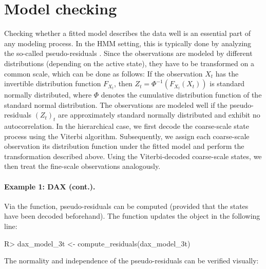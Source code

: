 \documentclass[article]{jss}
\newcommand{\fct}[1]{\code{#1()}}
\begin{document}
\section{Model checking} \label{sec:model_checking} %

Checking whether a fitted model describes the data well is an essential part of any modeling process. In the HMM setting, this is typically done by analyzing the so-called pseudo-residuals \citep{zuc16}. Since the observations are modeled by different distributions (depending on the active state), they have to be transformed on a common scale, which can be done as follows: If the observation $X_t$ has the invertible distribution function $F_{X_t}$, then $Z_t=\Phi^{-1}(F_{X_t} (X_t))$ is standard normally distributed, where $\Phi$ denotes the cumulative distribution function of the standard normal distribution. The observations are modeled well if the pseudo-residuals $(Z_t)_t$ are approximately standard normally distributed and exhibit no autocorrelation. In the hierarchical case, we first decode the coarse-scale state process using the Viterbi algorithm. Subsequently, we assign each coarse-scale observation its distribution function under the fitted model and perform the transformation described above. Using the Viterbi-decoded coarse-scale states, we then treat the fine-scale observations analogously.

\paragraph{Example 1: DAX (cont.).}

Via the \fct{compute\_residuals} function, pseudo-residuals can be computed (provided that the states have been decoded beforehand). The function updates the  object in the following line:

%
\begin{Schunk}
\begin{Sinput}
R> dax_model_3t <- compute_residuals(dax_model_3t)
\end{Sinput}
\end{Schunk}
%

The normality and independence of the pseudo-residuals can be verified visually:
\end{document}
